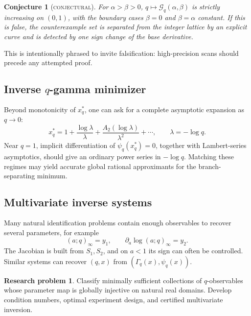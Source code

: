 \documentclass[11pt,oneside]{article}
\newtheorem{conjecture}[theorem]{Conjecture}
\theoremstyle{definition}
\theoremstyle{remark}
\theoremstyle{plain}
\theoremstyle{definition}
\newtheorem{researchproblem}[theorem]{Research problem}
\theoremstyle{remark}
\newcommand{\statusconjectural}{\textcolor{conjectureorange}{\textsc{conjectural}}}
\numberwithin{equation}{section}
\numberwithin{figure}{section}
\numberwithin{table}{section}
\let\reportsubsection\subsection
\let\reportsubsubsection\subsubsection
\let\section\reportsubsection
\let\subsection\reportsubsubsection
\begin{document}
\begin{conjecture}[\statusconjectural]
For \(\alpha>\beta>0\),
\(q\mapsto\mathcal G_q(\alpha,\beta)\) is strictly increasing on \((0,1)\),
with the boundary cases \(\beta=0\) and \(\beta=\alpha\) constant.  If this is
false, the counterexample set is separated from the integer lattice by an
explicit curve and is detected by one sign change of the base derivative.
\end{conjecture}
This is intentionally phrased to invite falsification: high-precision scans
should precede any attempted proof.

\section{Inverse \texorpdfstring{\(q\)}{q}-gamma minimizer}
Beyond monotonicity of \(x_q^*\), one can ask for a complete asymptotic
expansion as \(q\to0\):
\[
 x_q^*=1+\frac{\log\lambda}{\lambda}
 +\frac{A_2(\log\lambda)}{\lambda^2}+\cdots,
 \qquad \lambda=-\log q.
\]
Near \(q=1\), implicit differentiation of \(\psi_q(x_q^*)=0\), together with
Lambert-series asymptotics, should give an ordinary power series in
\(-\log q\).  Matching these regimes may yield accurate global rational
approximants for the branch-separating minimum.

\section{Multivariate inverse systems}
Many natural identification problems contain enough observables to recover
several parameters, for example
\[
 (a;q)_\infty=y_1,
 \qquad
 \partial_a\log(a;q)_\infty=y_2.
\]
The Jacobian is built from \(S_1,S_2\), and on \(a<1\) its sign can often be
controlled.  Similar systems can recover \((q,x)\) from \((\Gamma_q(x),
\psi_q(x))\).

\begin{researchproblem}
Classify minimally sufficient collections of \(q\)-observables whose parameter
map is globally injective on natural real domains.  Develop condition numbers,
optimal experiment design, and certified multivariate inversion.
\end{researchproblem}
\end{document}
